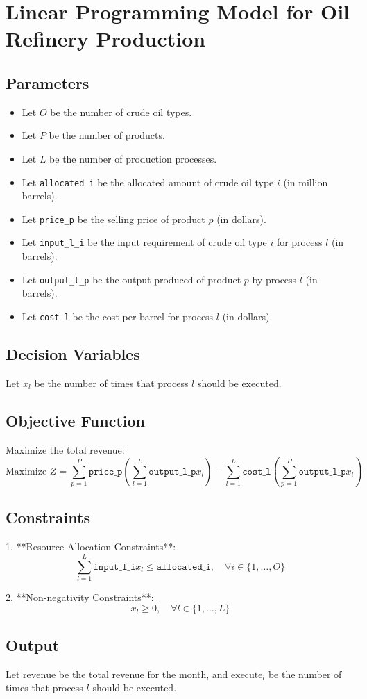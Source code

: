 \documentclass{article}
\begin{document}
\section*{Linear Programming Model for Oil Refinery Production}

\subsection*{Parameters}
\begin{itemize}
    \item Let $O$ be the number of crude oil types.
    \item Let $P$ be the number of products.
    \item Let $L$ be the number of production processes.
    \item Let \texttt{allocated\_i} be the allocated amount of crude oil type $i$ (in million barrels).
    \item Let \texttt{price\_p} be the selling price of product $p$ (in dollars).
    \item Let \texttt{input\_l\_i} be the input requirement of crude oil type $i$ for process $l$ (in barrels).
    \item Let \texttt{output\_l\_p} be the output produced of product $p$ by process $l$ (in barrels).
    \item Let \texttt{cost\_l} be the cost per barrel for process $l$ (in dollars).
\end{itemize}

\subsection*{Decision Variables}
Let $x_l$ be the number of times that process $l$ should be executed.

\subsection*{Objective Function}
Maximize the total revenue:
\[
\text{Maximize } Z = \sum_{p=1}^{P} \texttt{price\_p} \left( \sum_{l=1}^{L} \texttt{output\_l\_p} x_l \right) - \sum_{l=1}^{L} \texttt{cost\_l} \left( \sum_{p=1}^{P} \texttt{output\_l\_p} x_l \right)
\]

\subsection*{Constraints}
1. **Resource Allocation Constraints**:
\[
\sum_{l=1}^{L} \texttt{input\_l\_i} x_l \leq \texttt{allocated\_i}, \quad \forall i \in \{1, \ldots, O\}
\]

2. **Non-negativity Constraints**:
\[
x_l \geq 0, \quad \forall l \in \{1, \ldots, L\}
\]

\subsection*{Output}
Let $\text{revenue}$ be the total revenue for the month, and $\text{execute}_l$ be the number of times that process $l$ should be executed.
\end{document}
